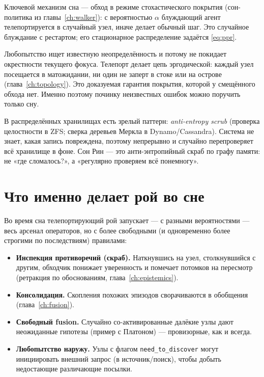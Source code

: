 Ключевой механизм сна --- обход в режиме стохастического покрытия
(сон-политика из главы~\ref{ch:walker}): с вероятностью $\alpha$ блуждающий
агент телепортируется в случайный узел, иначе делает обычный шаг. Это
случайное блуждание с рестартом; его стационарное распределение задаётся
\eqref{eq:ppr}.

\begin{principle}
Любопытство ищет известную неопределённость и потому не покидает окрестности
текущего фокуса. Телепорт делает цепь эргодической: каждый узел посещается в
матожидании, ни один не заперт в стоке или на острове
(глава~\ref{ch:topology}). Это доказуемая гарантия покрытия, которой у
смещённого обхода нет. Именно поэтому починку неизвестных ошибок можно
поручить только сну.
\end{principle}

\begin{intuition}
В распределённых хранилищах есть зрелый паттерн: \textit{anti-entropy scrub}
(проверка целостности в ZFS; сверка деревьев Меркла в Dynamo/Cassandra).
Система не знает, какая запись повреждена, поэтому непрерывно и случайно
перепроверяет всё хранилище в фоне. Сон Рин --- это анти-энтропийный скраб по
графу памяти: не «где сломалось?», а «регулярно проверяем всё понемногу».
\end{intuition}

\section{Что именно делает рой во сне}

Во время сна телепортирующий рой запускает --- с разными вероятностями ---
весь арсенал операторов, но с более свободными (и одновременно более строгими
по последствиям) правилами:
\begin{itemize}
\item \textbf{Инспекция противоречий (скраб).} Наткнувшись на узел,
столкнувшийся с другим, обходчик понижает уверенность и помечает потомков на
пересмотр (ретракция по обоснованиям, глава~\ref{ch:epistemics}).
\item \textbf{Консолидация.} Скопления похожих эпизодов сворачиваются в
обобщения (глава~\ref{ch:fusion}).
\item \textbf{Свободный fusion.} Случайно со-активированные далёкие узлы дают
неожиданные гипотезы (пример с Платоном) --- провизорные, как и всегда.
\item \textbf{Любопытство наружу.} Узлы с флагом \texttt{need\_to\_discover}
могут инициировать внешний запрос (в источник/поиск), чтобы добыть
недостающие различающие посылки.
\end{itemize}


